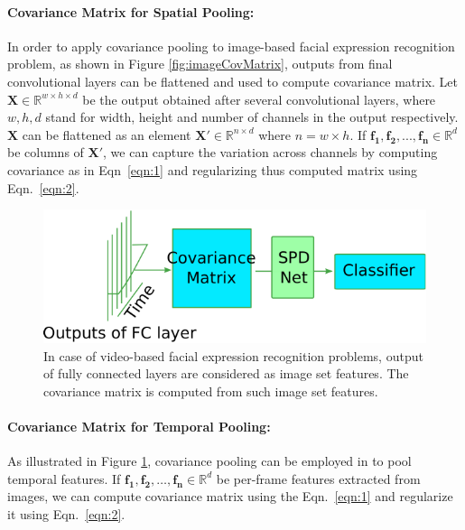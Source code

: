 \documentclass[10pt,twocolumn,letterpaper]{article}
\begin{document}
		\paragraph{Covariance Matrix for Spatial Pooling:}
		In order to apply covariance pooling to image-based facial expression recognition problem, as shown in Figure \ref{fig:imageCovMatrix}, outputs from final convolutional layers can be flattened and used to compute covariance matrix. Let $\mathbf{X} \in \mathbb{R}^{w\times h\times d}$ be the output obtained after several convolutional layers, where $w,h,d$ stand for width, height and number of channels in the output respectively. $\mathbf{X}$ can be flattened as an element $\mathbf{X'}\in\mathbb{R}^{n\times d}$ where $n=w\times h$. If $\mathbf{f_1},\mathbf{f_2},...,\mathbf{f_n}\in\mathbb{R}^d$ be columns of $\mathbf{X'}$, we can capture the variation across channels by computing covariance as in Eqn~\ref{eqn:1} and regularizing thus computed matrix using Eqn.~\ref{eqn:2}.
		
		
	    \begin{figure}
		\begin{center}
		    \includegraphics[width=.95\linewidth,keepaspectratio]{res/tempPool}
		\end{center}
		\caption{In case of video-based facial expression recognition problems, output of fully connected layers are considered as image set features. The covariance matrix is computed from such image set features.}
		\label{fig:videoCovMatrix}
	\end{figure}
	
	\paragraph{Covariance Matrix for Temporal Pooling:}
		As illustrated in Figure \ref{fig:videoCovMatrix}, covariance pooling can be employed in \cite{emoti14} to pool temporal features. If $\mathbf{f_1},\mathbf{f_2},\dots,\mathbf{f_n}\in \mathbb{R}^d$ be per-frame features extracted from images, we can compute covariance matrix using the Eqn.~\ref{eqn:1} and regularize it using Eqn.~\ref{eqn:2}.
		
\end{document}
